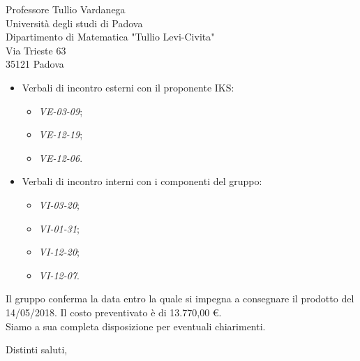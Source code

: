 \documentclass[12pt]{letter} %
\begin{document}
\begin{letter}{Professore Tullio Vardanega \\ Università degli studi di Padova \\ Dipartimento di Matematica "Tullio Levi-Civita" \\ Via Trieste 63 \\ 35121 Padova}
\begin{addmargin}[2em]{2em}
\begin{itemize}
      \item Verbali di incontro esterni con il proponente IKS: \begin{itemize}
      	\item \emph{VE-03-09};
      	\item \emph{VE-12-19};
      	\item \emph{VE-12-06}.
      \end{itemize}
      \item Verbali di incontro interni con i componenti del gruppo:
      \begin{itemize}
      	\item \emph{VI-03-20};
      	\item \emph{VI-01-31};
      	\item \emph{VI-12-20};
      	\item \emph{VI-12-07}.
      \end{itemize}
      \end{itemize}

  Il gruppo conferma la data entro la quale si impegna a consegnare il prodotto del 14/05/2018. Il costo preventivato è di 13.770,00 \euro. \\ Siamo a sua completa disposizione per eventuali chiarimenti.
\end{addmargin}

\closing{Distinti saluti,}




\end{letter}
 
\end{document}
